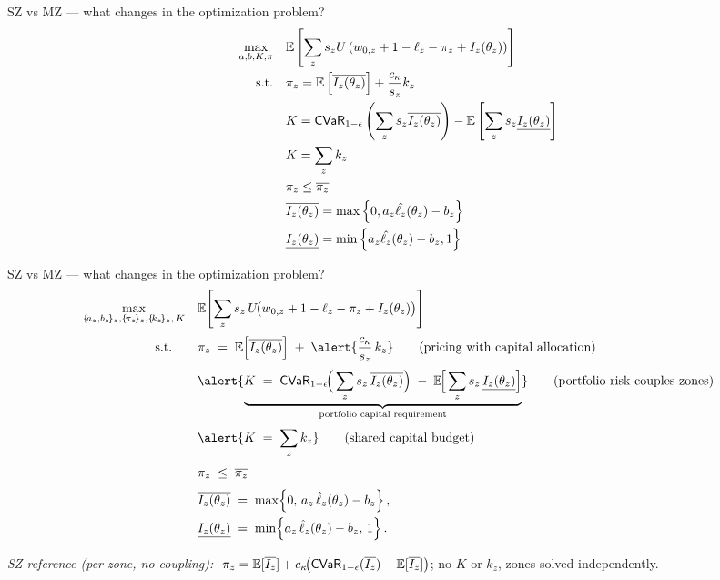 \documentclass{beamer}
\begin{document}
\begin{frame}{SZ vs MZ — what changes in the optimization problem?}
    \begin{align}
        \max_{a,b,K,\pi} &\quad \mathbb{E}\left [ \sum_z s_z U\left ( w_{0,z} + 1 -\ell_z -\pi_z + I_z(\theta_z) \right ) \right ]\nonumber\\
        \text{s.t.} &\quad \pi_z  = \mathbb{E}\left [ \overline{I_z(\theta_z)} \right ] + \frac{c_{\kappa}}{s_z}  k_z\\
        &\quad K = {\sf CVaR}_{1-\epsilon} \left ( \sum_z s_z\overline{I_z(\theta_z)} \right ) - \mathbb{E}\left [ \sum_{z} s_{z}\underline{I_{z}(\theta_{z})} \right ]\\
        &\quad K = \sum_z k_z\\
        &\quad\pi_z \leq \overline{\pi_z}\\
        &\quad \overline{I_z(\theta_z)} = \max \left \{0,a_z\hat{\ell_z}(\theta_z) - b_z \right \} \nonumber\\
        &\quad\underline{I_z(\theta_z)} = \min \left \{a_z\hat{\ell_z}(\theta_z)-b_z,1 \right \} \nonumber
      \end{align}
\end{frame}

\begin{frame}{SZ vs MZ — what changes in the optimization problem?}
    \small
    \begin{align}
    \max_{\{\!a_z,b_z\!\}_z,\{\!\pi_z\!\}_z,\{\!k_z\!\}_z,\,K}
    &\quad \mathbb{E}\!\left[ \sum_{z} s_z\,U\!\big( w_{0,z} + 1 - \ell_z - \pi_z + I_z(\theta_z) \big) \right]
    \label{eq:obj}
    \\[0.25em]
    \text{s.t.}\quad
    &\quad \pi_z \;=\; \mathbb{E}\!\left[\overline{I_z(\theta_z)}\right] \;+\; \alert{\frac{c_{\kappa}}{s_z}\,k_z}
    \tag{pricing with capital allocation}
    \label{eq:pricing}
    \\[0.25em]
    &\quad \alert{\underbrace{K \;=\; {\sf CVaR}_{1-\epsilon}\!\Big(\sum_{z} s_z\,\overline{I_z(\theta_z)}\Big)
    \;-\; \mathbb{E}\!\Big[\sum_{z} s_z\,\underline{I_z(\theta_z)}\Big]}_{\text{portfolio capital requirement}}}
    \tag{portfolio risk couples zones}
    \label{eq:portfolio}
    \\[0.25em]
    &\quad \alert{K \;=\; \sum_{z} k_z}
    \tag{shared capital budget}
    \\[0.25em]
    &\quad \pi_z \;\le\; \overline{\pi_z}
    \\[0.25em]
    &\quad \overline{I_z(\theta_z)} \;=\; \max\!\left\{0,\, a_z\,\hat{\ell}_z(\theta_z) - b_z \right\},\\
    &\quad \underline{I_z(\theta_z)} \;=\; \min\!\left\{a_z\,\hat{\ell}_z(\theta_z)-b_z,\,1 \right\}.
    \end{align}
    
    
    {\scriptsize \emph{SZ reference (per zone, no coupling):} $\ \pi_z=\mathbb{E}[\overline{I_z}] + c_\kappa\!\big({\sf CVaR}_{1-\epsilon}(\overline{I_z})-\mathbb{E}[\overline{I_z}]\big)$; no $K$ or $k_z$, zones solved independently.}
    \end{frame}
\end{document}
